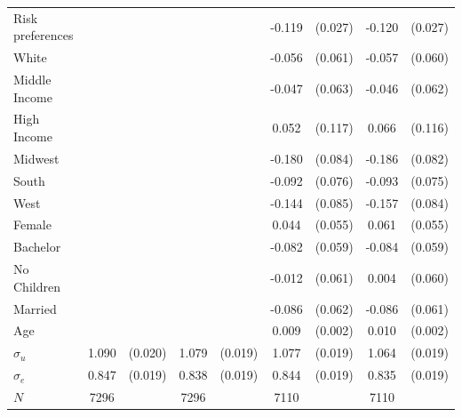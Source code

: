 \documentclass[12pt]{article}
\newcommand{\sym}[1]{\rlap{$^{#1}$}}
\begin{document}
\begin{table}[H]
{\begin{tabular}{l*{4}{cc}}
Risk preferences&                     &            &                     &            &      -0.119\sym{***}&     (0.027)&      -0.120\sym{***}&     (0.027)\\
White       &                     &            &                     &            &      -0.056         &     (0.061)&      -0.057         &     (0.060)\\
Middle Income&                     &            &                     &            &      -0.047         &     (0.063)&      -0.046         &     (0.062)\\
High Income &                     &            &                     &            &       0.052         &     (0.117)&       0.066         &     (0.116)\\
Midwest     &                     &            &                     &            &      -0.180\sym{**} &     (0.084)&      -0.186\sym{**} &     (0.082)\\
South       &                     &            &                     &            &      -0.092         &     (0.076)&      -0.093         &     (0.075)\\
West        &                     &            &                     &            &      -0.144\sym{*}  &     (0.085)&      -0.157\sym{*}  &     (0.084)\\
Female      &                     &            &                     &            &       0.044         &     (0.055)&       0.061         &     (0.055)\\
Bachelor    &                     &            &                     &            &      -0.082         &     (0.059)&      -0.084         &     (0.059)\\
No Children &                     &            &                     &            &      -0.012         &     (0.061)&       0.004         &     (0.060)\\
Married     &                     &            &                     &            &      -0.086         &     (0.062)&      -0.086         &     (0.061)\\
Age         &                     &            &                     &            &       0.009\sym{***}&     (0.002)&       0.010\sym{***}&     (0.002)\\

$\sigma_u $    &       1.090\sym{***}&     (0.020)&       1.079\sym{***}&     (0.019)&       1.077\sym{***}&     (0.019)&       1.064\sym{***}&     (0.019)\\
$\sigma_e $     &       0.847\sym{***}&     (0.019)&       0.838\sym{***}&     (0.019)&       0.844\sym{***}&     (0.019)&       0.835\sym{***}&     (0.019)\\
\(N\)       &        7296         &            &        7296         &            &        7110         &            &        7110         &            \\
\end{tabular}
}





\end{table}
\end{document}
